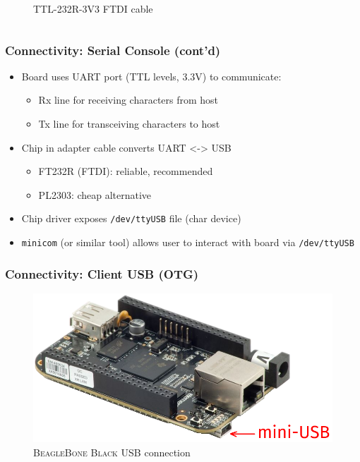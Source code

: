 \begin{frame}
\begin{columns}
\begin{figure}
      \caption{TTL-232R-3V3 FTDI cable}
    \end{figure}
  \end{columns}
\end{frame}

\begin{frame}
  \frametitle{Connectivity: Serial Console (cont'd)}
  \begin{itemize}
    \item Board uses UART port (TTL levels, 3.3V) to communicate:
    \begin{itemize}
      \item Rx line for receiving characters from host
      \item Tx line for transceiving characters to host
    \end{itemize}
    \item Chip in adapter cable converts UART <-> USB
    \begin{itemize}
      \item FT232R (FTDI): reliable, recommended
      \item PL2303: cheap alternative
    \end{itemize}
    \item Chip driver exposes \texttt{/dev/ttyUSB} file (char device)
    \item \texttt{minicom} (or similar tool) allows user to interact with board
          via \texttt{/dev/ttyUSB}
  \end{itemize}
\end{frame}

\begin{frame}
  \frametitle{Connectivity: Client USB (OTG)}
  \begin{figure}
    \centering
    \includegraphics[scale=0.4]{images/bbb-otg.png}
    \caption{\textsc{BeagleBone Black} USB connection}
  \end{figure}
\end{frame}

